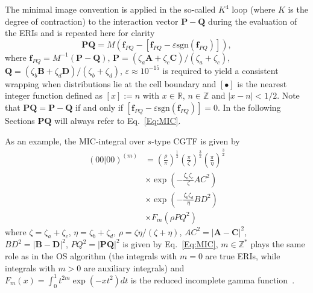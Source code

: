 \documentclass[prl,twocolumn,showpacs,twocolumngrid,superbib]{revtex4}
\begin{document}
The minimal image convention is applied in the so-called $K^4$ loop 
(where $K$ is the degree of contraction)
to the interaction vector $\mathbf{P-Q}$ during the evaluation of the ERIs and is 
repeated here for clarity 
\begin{equation}\label{Eq:MIC}
  \mathbf{PQ}=M(\mathbf{f}_{PQ}-[\mathbf{f}_{PQ}-\varepsilon \mathrm{sgn}(\mathbf{f}_{PQ})]),
\end{equation}
where $\mathbf{f}_{PQ}=M^{-1}(\mathbf{P-Q})$, 
$\mathbf{P}=(\zeta_a\mathbf{A}+\zeta_c\mathbf{C})/(\zeta_a+\zeta_c)$, 
$\mathbf{Q}=(\zeta_b\mathbf{B}+\zeta_d\mathbf{D})/(\zeta_b+\zeta_d)$, 
$\varepsilon\approx 10^{-15}$ is 
required to yield a consistent wrapping when distributions lie at the cell boundary 
and $[\bullet]$ is the nearest integer function defined as 
$[x]:=n$ with $x\in \mathbb{R}$, $n\in \mathbb{Z}$ and $|x-n|<1/2$.
Note that $\mathbf{PQ}=\mathbf{P-Q}$ if and only if $[\mathbf{f}_{PQ}-\varepsilon\mathrm{sgn}(\mathbf{f}_{PQ})]=0$.
In the following Sections $\mathbf{PQ}$ will always refer to Eq.~\ref{Eq:MIC}.

As an example, the MIC-integral over $s$-type CGTF is given by
\begin{equation}
  \begin{split}
  (00|00)^{(m)}&=\left(\frac{\rho}{\pi}\right)^{\frac{1}{2}}
    \left(\frac{\pi}{\zeta}\right)^{\frac{3}{2}}\left(\frac{\pi}{\eta}\right)^{\frac{3}{2}}\\
    &\times\exp\left(-\frac{\zeta_a\zeta_c}{\zeta}AC^2\right) \\
    &\times\exp\left(-\frac{\zeta_b\zeta_d}{\eta}BD^2\right) \\
    &\times F_{m}(\rho PQ^2)
  \end{split}
\end{equation}
where $\zeta=\zeta_a+\zeta_c$, $\eta=\zeta_b+\zeta_d$, $\rho=\zeta\eta/(\zeta+\eta)$,
$AC^2=|\mathbf{A-C}|^2$, $BD^2=|\mathbf{B-D}|^2$, $PQ^2=|\mathbf{PQ}|^2$ 
is given by Eq.~\ref{Eq:MIC}, $m\in\mathbb{Z}^*$ plays %
the same role as in the OS algorithm (the integrals with $m=0$ are true ERIs, while
integrals with $m>0$ are auxiliary integrals)
and $F_m(x)=\int_0^1t^{2m}\exp(-xt^2)dt$ is the reduced incomplete gamma function~\cite{IShavitt63}.
\end{document}
